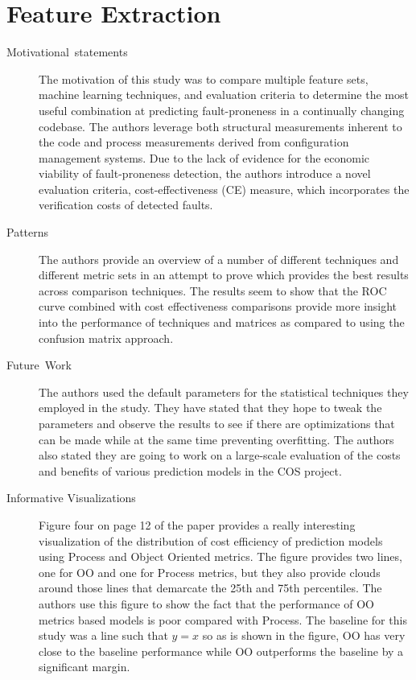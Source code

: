 \documentclass[english]{article}
\begin{document}
\section*{Feature Extraction}
\begin{description}
\item [{Motivational~statements}] The motivation of this study was to compare multiple feature sets, machine learning techniques, and evaluation criteria to determine the most useful combination at predicting fault-proneness in a continually changing codebase. The authors leverage both structural measurements inherent to the code and process measurements derived from configuration management systems. Due to the lack of evidence for the economic viability of fault-proneness detection, the authors introduce a novel evaluation criteria, cost-effectiveness (CE) measure, which incorporates the verification costs of detected faults.
\item [{Patterns}] The authors provide an overview of a number of different
techniques and different metric sets in an attempt to prove which
provides the best results across comparison techniques. The results
seem to show that the ROC curve combined with cost effectiveness comparisons
provide more insight into the performance of techniques
and matrices as compared to using the confusion matrix approach. 
\item [{Future~Work}] The authors used the default parameters for the
statistical techniques they employed in the study. They have stated
that they hope to tweak the parameters and observe the results to
see if there are optimizations that can be made while at the same
time preventing overfitting. The authors also stated they are going
to work on a large-scale evaluation of the costs and benefits of various
prediction models in the COS project. 
\item [{Informative Visualizations}] Figure four on page 12 of the paper
provides a really interesting visualization of the distribution of
cost efficiency of prediction models using Process and Object Oriented
metrics. The figure provides two lines, one for OO and one for Process
metrics, but they also provide clouds around those lines that demarcate
the 25th and 75th percentiles. The authors use this figure to show
the fact that the performance of OO metrics based models is poor compared
with Process. The baseline for this study was a line such that $y=x$
so as is shown in the figure, OO has very close to the baseline performance
while OO outperforms the baseline by a significant margin. 
\end{description}
\end{document}
